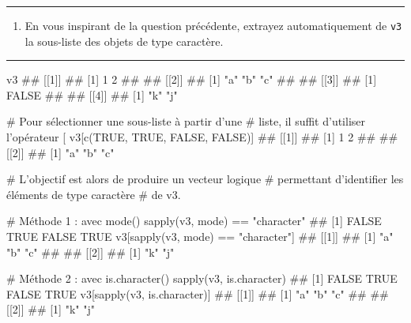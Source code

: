 \documentclass[12pt,twosided, notitlepage]{book}
\newenvironment{Shaded}{}{}
\newcommand{\KeywordTok}[1]{\textcolor[rgb]{0.00,0.00,1.00}{#1}}
\newcommand{\StringTok}[1]{\textcolor[rgb]{0.00,0.50,0.50}{#1}}
\newcommand{\CommentTok}[1]{\textcolor[rgb]{0.00,0.50,0.00}{#1}}
\newcommand{\OtherTok}[1]{\textcolor[rgb]{1.00,0.25,0.00}{#1}}
\newcommand{\OperatorTok}[1]{#1}
\newcommand{\NormalTok}[1]{#1}
\providecommand{\tightlist}{%
  \setlength{\itemsep}{0pt}\setlength{\parskip}{0pt}}
\newif \ifsol
\renewenvironment{Shaded}{\begin{snugshade}}{\end{snugshade}}
\begin{document}
\begin{center} \rule{0.5\linewidth}{\linethickness}\end{center}

\bigskip  \fi 

\begin{enumerate}
\def\labelenumi{\alph{enumi}.}
\setcounter{enumi}{2}
\tightlist
\item
  En vous inspirant de la question précédente, extrayez automatiquement
  de \texttt{v3} la sous-liste des objets de type
  caractère.
\end{enumerate}

\ifsol 

\begin{center} \rule{0.5\linewidth}{\linethickness}\end{center}

\begin{Shaded}
\begin{Highlighting}[]
\NormalTok{v3}
\NormalTok{  ## [[1]]}
\NormalTok{  ## [1] 1 2}
\NormalTok{  ## }
\NormalTok{  ## [[2]]}
\NormalTok{  ## [1] "a" "b" "c"}
\NormalTok{  ## }
\NormalTok{  ## [[3]]}
\NormalTok{  ## [1] FALSE}
\NormalTok{  ## }
\NormalTok{  ## [[4]]}
\NormalTok{  ## [1] "k" "j"}

\CommentTok{# Pour sélectionner une sous-liste à partir d'une}
\CommentTok{# liste, il suffit d'utiliser l'opérateur [}
\NormalTok{v3[}\KeywordTok{c}\NormalTok{(}\OtherTok{TRUE}\NormalTok{, }\OtherTok{TRUE}\NormalTok{, }\OtherTok{FALSE}\NormalTok{, }\OtherTok{FALSE}\NormalTok{)]}
\NormalTok{  ## [[1]]}
\NormalTok{  ## [1] 1 2}
\NormalTok{  ## }
\NormalTok{  ## [[2]]}
\NormalTok{  ## [1] "a" "b" "c"}

\CommentTok{# L'objectif est alors de produire un vecteur logique }
\CommentTok{# permettant d'identifier les éléments de type caractère }
\CommentTok{# de v3. }

\CommentTok{# Méthode 1 : avec mode()}
\KeywordTok{sapply}\NormalTok{(v3, mode) }\OperatorTok{==}\StringTok{ "character"}
\NormalTok{  ## [1] FALSE  TRUE FALSE  TRUE}
\NormalTok{v3[}\KeywordTok{sapply}\NormalTok{(v3, mode) }\OperatorTok{==}\StringTok{ "character"}\NormalTok{]}
\NormalTok{  ## [[1]]}
\NormalTok{  ## [1] "a" "b" "c"}
\NormalTok{  ## }
\NormalTok{  ## [[2]]}
\NormalTok{  ## [1] "k" "j"}

\CommentTok{# Méthode 2 : avec is.character()}
\KeywordTok{sapply}\NormalTok{(v3, is.character)}
\NormalTok{  ## [1] FALSE  TRUE FALSE  TRUE}
\NormalTok{v3[}\KeywordTok{sapply}\NormalTok{(v3, is.character)]}
\NormalTok{  ## [[1]]}
\NormalTok{  ## [1] "a" "b" "c"}
\NormalTok{  ## }
\NormalTok{  ## [[2]]}
\NormalTok{  ## [1] "k" "j"}
\end{Highlighting}
\end{Shaded}
\end{document}
